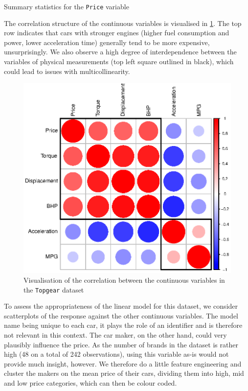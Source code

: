 \documentclass[titlepage]{article}
\begin{document}
\begin{table}[!htb]
  \centering
  
  \caption{Summary statistics for the \texttt{Price} variable}
  \label{tab:q3-summary}
\end{table}

The correlation structure of the continuous variables is visualised in \cref{fig:q3-corplot}. The top row indicates that cars with stronger engines (higher fuel consumption and power, lower acceleration time) generally tend to be more expensive, unsurprisingly. We also observe a high degree of interdependence between the variables of physical measurements (top left square outlined in black), which could lead to issues with multicollinearity.

\begin{figure}[!htb]
  \centering
  \includegraphics{q3-corplot}
  \caption{Visualisation of the correlation between the continuous variables in the \texttt{Topgear} dataset}
  \label{fig:q3-corplot}
\end{figure}

To assess the appropriateness of the linear model for this dataset, we consider scatterplots of the response against the other continuous variables. The model name being unique to each car, it plays the role of an identifier and is therefore not relevant in this context. The car maker, on the other hand, could very plausibly influence the price. As the number of brands in the dataset is rather high (48 on a total of 242 observations), using this variable as-is would not provide much insight, however. We therefore do a little feature engineering and cluster the makers on the mean price of their cars, dividing them into high, mid and low price categories, which can then be colour coded.
\end{document}
